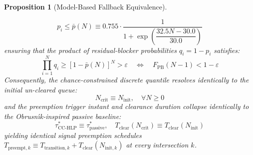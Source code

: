 \documentclass[journal,10pt,twocolumn]{IEEEtran}
\newtheorem{proposition}{Proposition}
\begin{document}
\begin{proposition}[Model-Based Fallback Equivalence]
\begin{enumerate}
\begin{equation}
    p_i \le \bar{p}(N) \equiv 0.755 \cdot \frac{1}{1 + \exp\left( \dfrac{32.5 N - 30.0}{30.0} \right)}
    \end{equation}
    ensuring that the product of residual-blocker probabilities $q_i = 1 - p_i$ satisfies:
    \begin{equation}
    \prod_{i=1}^N q_i \ge [1 - \bar{p}(N)]^N > \varepsilon \quad\Longleftrightarrow\quad F_{\text{PB}}(N - 1) < 1 - \varepsilon
    \end{equation}
    Consequently, the chance-constrained discrete quantile resolves identically to the initial un-cleared queue:
    \begin{equation}
    N_{\text{crit}} \equiv N_{\text{init}}, \quad \forall N \ge 0
    \end{equation}
    and the preemption trigger instant and clearance duration collapse identically to the Obrusn\'{\i}k-inspired passive baseline:
    \begin{equation}
    \tau^*_{\text{CC-HLP}} \equiv \tau^*_{\text{passive}}, \quad T_{\text{clear}}(N_{\text{crit}}) \equiv T_{\text{clear}}(N_{\text{init}})
    \end{equation}
    yielding identical signal preemption schedules $T_{\text{preempt}, k} \equiv T_{\text{transition}, k} + T_{\text{clear}}(N_{\text{init}, k})$ at every intersection $k$.
\end{enumerate}
\end{proposition}
\end{document}
